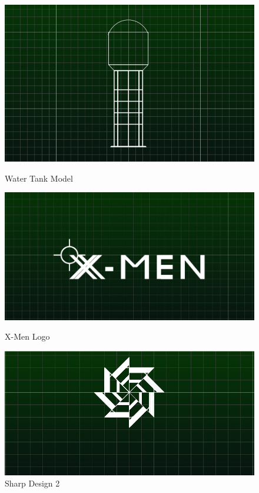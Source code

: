 \begin{figure}
\begin{center}
\includegraphics[scale=0.5]{images/lualogo/w2.png}
\caption{Water Tank Model}
\includegraphics[scale=0.4]{images/lualogo/xmen.png} 
\caption{X-Men Logo}
\includegraphics[scale=0.4]{images/lualogo/chakra2.png}
\caption{Sharp Design 2}
\end{center}
\end{figure}
